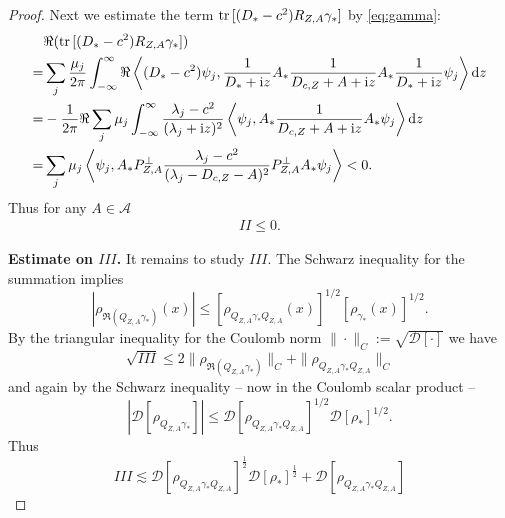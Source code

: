 \documentclass[a4paper]{amsart}
\def\tr{{\rm tr \,}}
\def\cA{\mathcal{A}}
\def\cD{\mathcal{D}}
\def\rd{\mathrm{d}}
\def\ri{\mathrm{i}}
\begin{document}
\begin{proof}
Next we estimate the term $\tr[(D_*-c^2) R_{Z,A}\gamma_*]$ by
\eqref{eq:gamma}:
\begin{equation}
  \label{eq:99}
  \begin{split}
    &\Re(\tr[(D_*-c^2) R_{Z,A}\gamma_*])\\
    =&\sum_j{\mu_j\over2\pi}\int_{-\infty}^{\infty}\Re\left<(D_*-c^2)\psi_j, \frac{1}{D_*+\ri z}A_* \frac{1}{D_{c,Z}+A+\ri z}A_*\frac{1}{D_*+\ri z}\psi_j\right>\rd z \\
    =& -\frac{1}{2\pi} \Re\sum_{j}\mu_j \int_{-\infty}^{\infty} \frac{\lambda_j-c^2}{(\lambda_j+\ri z)^2} \left<\psi_j, A_* \frac{1}{D_{c,Z}+A+\ri z} A_* \psi_j \right> \rd z\\
    =& \sum_{j}\mu_j  \left<\psi_j, A_*  P_{Z,A}^{\perp}\frac{\lambda_j-c^2}{(\lambda_j-D_{c,Z}-A)^2} P_{Z,A}^{\perp} A_* \psi_j \right> <0.
  \end{split}
\end{equation}
Thus for any $A\in\cA$
\begin{align}\label{eq:II}
  II \leq 0.
\end{align}

\medskip

{\bf Estimate on $III$.} It remains to study $III$. The Schwarz
inequality for the summation implies
\begin{equation}
    |\rho_{\Re(Q_{Z,A}\gamma_*)}(x)|\leq [\rho_{Q_{Z,A}\gamma_* Q_{Z,A}}(x)]^{1/2}[\rho_{\gamma_*}(x)]^{1/2}.
  \end{equation}
  By the triangular inequality for the Coulomb norm
  $\|\cdot\|_C:=\sqrt{\cD[\cdot]}$ we have
\begin{equation}
  \sqrt{III} \leq 2\|\rho_{\Re(Q_{Z,A}\gamma_*)}\|_C
  +\|\rho_{Q_{Z,A}\gamma_*Q_{Z,A}}\|_C
\end{equation}
and again by the Schwarz inequality -- now in the Coulomb scalar product --
\begin{equation}
 \left|\cD[\rho_{Q_{Z,A}\gamma_*} ]\right|\leq   \cD[\rho_{Q_{Z,A}\gamma_* Q_{Z,A}}]^{1/2}\cD[\rho_*]^{1/2}.
\end{equation}
Thus
\begin{equation}\label{eq:III-decomp}
  III\lesssim \cD[\rho_{Q_{Z,A}\gamma_* Q_{Z,A}}]^\frac12  \cD[\rho_*]^\frac12
  + \cD[\rho_{Q_{Z,A}\gamma_* Q_{Z,A}}]
\end{equation}


\end{proof}
\end{document}
